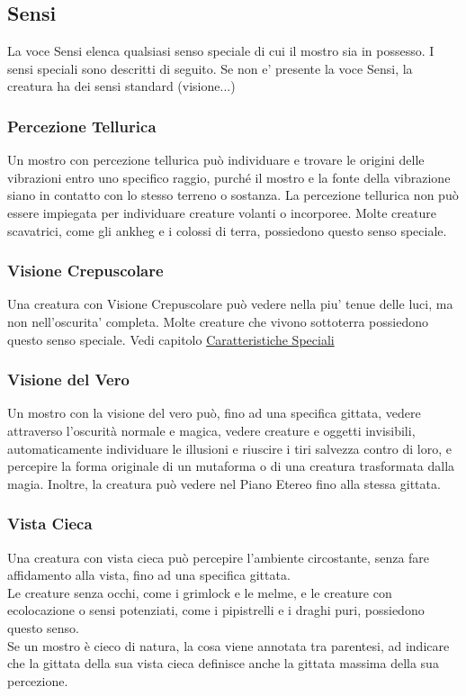 \subsection{Sensi}

La voce Sensi elenca qualsiasi senso speciale di cui il mostro sia in possesso. I sensi speciali sono descritti di seguito. Se non e' presente la voce Sensi, la creatura ha dei sensi standard (visione...)

\subsubsection{Percezione Tellurica}

Un mostro con percezione tellurica può individuare e trovare le origini delle vibrazioni entro uno specifico raggio, purché il mostro e la fonte della vibrazione siano in contatto con lo stesso terreno o sostanza. La percezione tellurica non può essere impiegata per individuare creature volanti o incorporee. Molte creature scavatrici, come gli ankheg e i colossi di terra, possiedono questo senso speciale.

\subsubsection{Visione Crepuscolare}

Una creatura con Visione Crepuscolare può vedere nella piu' tenue delle luci, ma non nell'oscurita' completa. Molte creature che vivono sottoterra possiedono questo senso
speciale.  Vedi capitolo \hyperref[sec:sec:visione-e-luce]{Caratteristiche Speciali}

\subsubsection{Visione del Vero}

Un mostro con la visione del vero può, fino ad una specifica gittata, vedere attraverso l'oscurità normale e magica, vedere creature e oggetti invisibili, automaticamente individuare le illusioni e riuscire i tiri salvezza contro di loro, e percepire la forma originale di un mutaforma o di una creatura trasformata dalla magia. Inoltre, la creatura può vedere nel Piano Etereo fino alla stessa gittata.

\subsubsection{Vista Cieca}

Una creatura con vista cieca può percepire l'ambiente circostante, senza fare affidamento alla vista, fino ad una specifica gittata. \\
Le creature senza occhi, come i grimlock e le melme, e le creature con ecolocazione o sensi potenziati, come i pipistrelli e i draghi puri, possiedono questo senso. \\
Se un mostro è cieco di natura, la cosa viene annotata tra parentesi, ad indicare che la gittata della sua vista cieca definisce anche la gittata massima della sua percezione.\\

